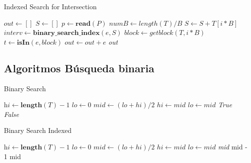 \documentclass[11pt]{article}
\begin{document}
\begin{algorithm}
\caption{Indexed Search for Intersection}
\label{alg:indexed_search}
\begin{algorithmic}[1]
\State $\textit{out} \gets []$
\State $\textit{S} \gets []$
\State $\textit{p} \gets \textbf{read}(P)$
\State $\textit{numB} \gets length(T)/B$
\State $S \gets S + T[i*B]$
\EndFor
{}
\State $interv \gets \textbf{binary\_search\_index}(e,S)$
\State $block \gets getblock(T, i*B) $
\State $t \gets \textbf{isIn}(e, block)$
    \State $out \gets out + e$
\EndIf
\EndFor
\State \Return \textit{out}
\EndProcedure
\end{algorithmic}
\end{algorithm}

\newpage
\subsection{Algoritmos Búsqueda binaria}

\begin{algorithm}
\caption{Binary Search}
\label{alg:binary}
\begin{algorithmic}[1]
\State $\textit{hi} \gets \textbf{length}(T) - 1$
\State $\textit{lo} \gets 0$
\State $mid \gets (lo + hi)/2$
    \State $hi \gets mid$
\Else 
        \State $lo \gets mid$
    \Else 
        \State \Return \textit{True}
    \EndIf
\EndIf
\EndWhile
\State \Return \textit{False}
\EndProcedure
\end{algorithmic}
\end{algorithm}

\begin{algorithm}
\caption{Binary Search Indexed}
\label{alg:binary_index}
\begin{algorithmic}
\State $\textit{hi} \gets \textbf{length}(T) - 1$
\State $\textit{lo} \gets 0$
\State $mid \gets (lo + hi)/2$
    \State $hi \gets mid$
\Else 
        \State $lo \gets mid$
    \Else 
        \State \Return \textit{mid}
    \EndIf
\EndIf
\EndWhile
{}
    \State \Return mid - 1
\Else
    \State \Return mid
\EndIf
\EndProcedure
\end{algorithmic}
\end{algorithm}

\newpage
\end{document}
